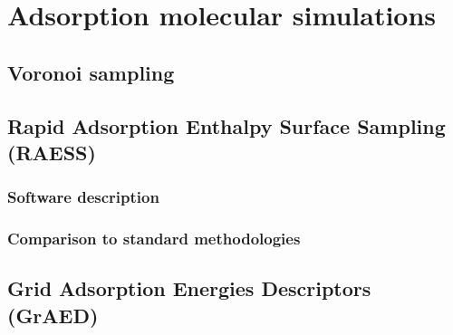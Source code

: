 \documentclass[main]{subfiles}
\begin{document}
\chapter{Adsorption molecular simulations}
\vspace*{-1\baselineskip}

\section{Voronoi sampling}

\section{Rapid Adsorption Enthalpy Surface Sampling (RAESS)}

\subsection{Software description}

\subsection{Comparison to standard methodologies}

\section{Grid Adsorption Energies Descriptors (GrAED)}


\OnlyInSubfile{\printglobalbibliography}
\end{document}
